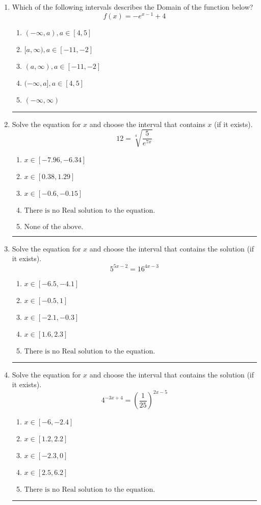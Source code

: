 \documentclass[14pt]{extbook}
\newcommand{\litem}[1]{\item#1\hspace*{-1cm}\rule{\textwidth}{0.4pt}}
\begin{document}
\begin{enumerate}
\litem{
Which of the following intervals describes the Domain of the function below?\[ f(x) = -e^{x-1}+4 \]\begin{enumerate}[label=\Alph*.]
\item \( (-\infty, a), a \in [4, 5] \)
\item \( [a, \infty), a \in [-11, -2] \)
\item \( (a, \infty), a \in [-11, -2] \)
\item \( (-\infty, a], a \in [4, 5] \)
\item \( (-\infty, \infty) \)

\end{enumerate} }
\litem{
 Solve the equation for $x$ and choose the interval that contains $x$ (if it exists).\[  12 = \sqrt[4]{\frac{5}{e^{7x}}} \]\begin{enumerate}[label=\Alph*.]
\item \( x \in [-7.96, -6.34] \)
\item \( x \in [0.38, 1.29] \)
\item \( x \in [-0.6, -0.15] \)
\item \( \text{There is no Real solution to the equation.} \)
\item \( \text{None of the above.} \)

\end{enumerate} }
\litem{
Solve the equation for $x$ and choose the interval that contains the solution (if it exists).\[ 5^{5x-2} = 16^{4x-3} \]\begin{enumerate}[label=\Alph*.]
\item \( x \in [-6.5, -4.1] \)
\item \( x \in [-0.5, 1] \)
\item \( x \in [-2.1, -0.3] \)
\item \( x \in [1.6, 2.3] \)
\item \( \text{There is no Real solution to the equation.} \)

\end{enumerate} }
\litem{
Solve the equation for $x$ and choose the interval that contains the solution (if it exists).\[ 4^{-3x+4} = \left(\frac{1}{25}\right)^{2x-5} \]\begin{enumerate}[label=\Alph*.]
\item \( x \in [-6, -2.4] \)
\item \( x \in [1.2, 2.2] \)
\item \( x \in [-2.3, 0] \)
\item \( x \in [2.5, 6.2] \)
\item \( \text{There is no Real solution to the equation.} \)


\end{enumerate}}
\end{enumerate}
\end{document}
